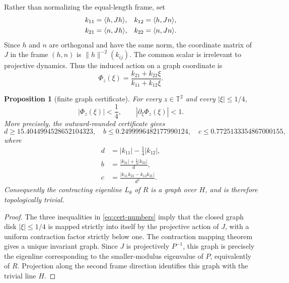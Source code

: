 \documentclass[11pt]{amsart}
\newtheorem{proposition}[theorem]{Proposition}
\theoremstyle{remark}
\newcommand{\T}{\mathbb T}
\begin{document}
Rather than normalizing the equal-length frame, set
\begin{align}\label{eq:kij-def}
 k_{11}&=\langle h,Jh\rangle, &
 k_{12}&=\langle h,Jn\rangle,\notag\\
 k_{21}&=\langle n,Jh\rangle, &
 k_{22}&=\langle n,Jn\rangle.
\end{align}
Since $h$ and $n$ are orthogonal and have the same norm, the coordinate matrix
of $J$ in the frame $(h,n)$ is $\|h\|^{-2}(k_{ij})$.  The common scalar is
irrelevant to projective dynamics.  Thus the induced action on a graph
coordinate is
\begin{equation}\label{eq:Phi}
 \Phi_z(\xi)=\frac{k_{21}+k_{22}\xi}{k_{11}+k_{12}\xi}.
\end{equation}

\begin{proposition}[finite graph certificate]\label{prop:certificate}
For every $z\in\T^2$ and every $|\xi|\le1/4$,
\begin{equation}\label{eq:graph-cert}
 |\Phi_z(\xi)|<\frac14,
 \qquad
 |\partial_\xi\Phi_z(\xi)|<1.
\end{equation}
More precisely, the outward-rounded certificate gives
\begin{equation}\label{eq:cert-numbers}
 d\ge 15.4044994528652104323,
 \quad
 b\le0.2499996482177990124,
 \quad
 c\le0.7725133354867000155,
\end{equation}
where
\begin{align*}
 d&=|k_{11}|-\tfrac14|k_{12}|,\\
 b&=\frac{|k_{21}|+\frac14|k_{22}|}{d},\\
 c&=\frac{|k_{11}k_{22}-k_{12}k_{21}|}{d^2}.
\end{align*}
Consequently the contracting eigenline $L_\theta$ of $R$ is a graph over
$H$, and is therefore topologically trivial.
\end{proposition}

\begin{proof}
The three inequalities in \eqref{eq:cert-numbers} imply that the closed graph
disk $|\xi|\le1/4$ is mapped strictly into itself by the projective action of
$J$, with a uniform contraction factor strictly below one.  The contraction
mapping theorem gives a unique invariant graph.  Since $J$ is projectively
$P^{-1}$, this graph is precisely the eigenline corresponding to the
smaller-modulus eigenvalue of $P$, equivalently of $R$.  Projection along the
second frame direction identifies this graph with the trivial line $H$.
\end{proof}
\end{document}
